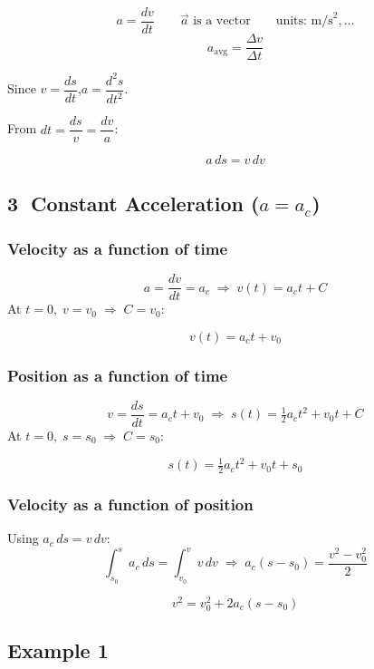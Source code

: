 \documentclass{wilson-summary}
\begin{document}
\[
  a = \frac{dv}{dt} \qquad \vec{a} \text{ is a vector} \qquad \text{units: m/s}^2,\ldots
\]
\[
  a_{\text{avg}} = \frac{\Delta v}{\Delta t}
\]
 
Since $v = \dfrac{ds}{dt}$,\quad $a = \dfrac{d^2s}{dt^2}$.
 
From $dt = \dfrac{ds}{v} = \dfrac{dv}{a}$:
 
\begin{keybox}
\[
  a\,ds = v\,dv
\]
\end{keybox}
 
\subsection*{\textcircled{\small 3}\; Constant Acceleration ($a = a_c$)}
 
\subsubsection*{Velocity as a function of time}
\[
  a = \frac{dv}{dt} = a_c
  \;\Rightarrow\;
  v(t) = a_c t + C
\]
At $t=0,\; v = v_0 \;\Rightarrow\; C = v_0$:
\begin{keybox}
\[
  v(t) = a_c t + v_0
\]
\end{keybox}
 
\subsubsection*{Position as a function of time}
\[
  v = \frac{ds}{dt} = a_c t + v_0
  \;\Rightarrow\;
  s(t) = \tfrac{1}{2}a_c t^2 + v_0 t + C
\]
At $t=0,\; s=s_0 \;\Rightarrow\; C=s_0$:
\begin{keybox}
\[
  s(t) = \tfrac{1}{2}a_c t^2 + v_0 t + s_0
\]
\end{keybox}
 
\subsubsection*{Velocity as a function of position}
Using $a_c\,ds = v\,dv$:
\[
  \int_{s_0}^{s} a_c\,ds = \int_{v_0}^{v} v\,dv
  \;\Rightarrow\;
  a_c(s - s_0) = \frac{v^2 - v_0^2}{2}
\]
\begin{keybox}
\[
  v^2 = v_0^2 + 2a_c(s - s_0)
\]
\end{keybox}
 
\bigskip
\subsection*{Example 1}
 
\end{document}
